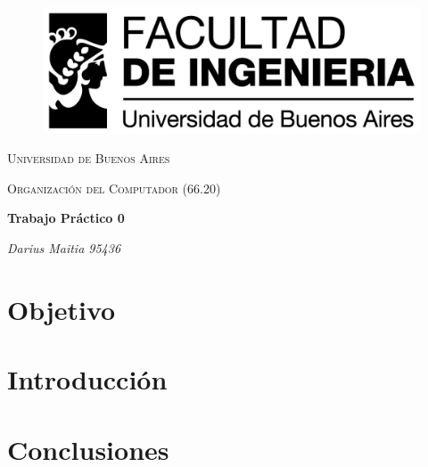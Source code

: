 \documentclass[a4paper,10pt]{article}
\begin{document}
\begin{figure}
 \centering
   \includegraphics[width=1\textwidth]{fiuba.jpg}
\end{figure}

\begin{titlepage}
		\centering
		{\scshape\LARGE Universidad de Buenos Aires \par}
		\vspace{1cm}
		{\scshape\Large Organización del Computador (66.20)\par}
		\vspace{1.5cm}
		{\huge\bfseries Trabajo Práctico 0 \par}
		\vspace{1cm}
		{\Large\itshape Darius Maitia 95436 \par}
        \vspace{1cm}
    {\Large\itshape \par}
    \vspace{1cm}  
\end{titlepage}

\tableofcontents
\newpage

\section{Objetivo}

\section{Introducción}

\section{Conclusiones}
\end{document}
